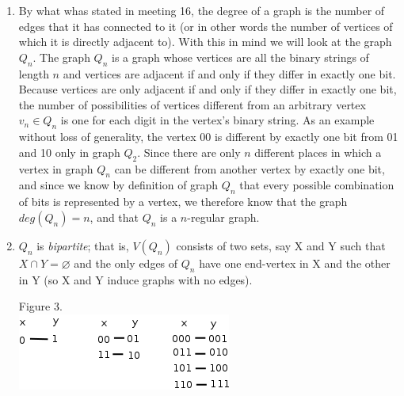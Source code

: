 \documentclass[10pt,a4paper]{report}
\begin{document}
\begin{enumerate}
			\item[] By what whas stated in meeting 16, the degree of a graph is the number of edges that it has connected to it (or in other words the number of vertices of which it is directly adjacent to).  With this in mind we will look at the graph $Q_{n}$.  The graph $Q_{n}$ is a graph whose vertices are all the binary strings of length $n$ and vertices are adjacent if and only if they differ in exactly one bit.  Because vertices are only adjacent if and only if they differ in exactly one bit, the number of possibilities of vertices different from an arbitrary vertex $v_{n}\in Q_{n}$ is one for each digit in the vertex's binary string.  As an example without loss of generality, the vertex 00 is different by exactly one bit from 01 and 10 only in graph $Q_{2}$.  Since there are only $n$ different places in which a vertex in graph $Q_{n}$ can be different from another vertex by exactly one bit, and since we know by definition of graph $Q_{n}$ that every possible combination of bits is represented by a vertex, we therefore know that the graph $deg(Q_{n})=n$, and that $Q_{n}$ is a $n$-regular graph.
			
			\item $Q_n$ is \textit{bipartite}; that is, $V(Q_n)$ consists of two sets, say X and Y such that $X\cap Y = \varnothing$ and the only edges of $Q_n$ have one end-vertex in X and the other in Y (so X and Y induce graphs with no edges).\\
			\begin{center}
				Figure 3.\\
				\includegraphics[scale=.5]{2_3.png}
			\end{center}
			

\end{enumerate}
\end{document}
